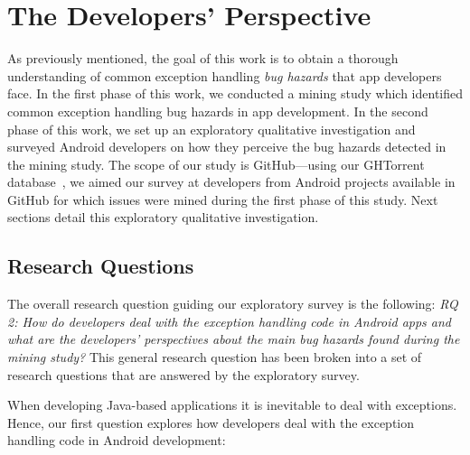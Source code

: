 {\bigskip


\bigskip

\section{The Developers' Perspective}
\label{sec:dev}


As previously mentioned, the goal of this work is to obtain a thorough understanding of common exception handling \emph{bug hazards} that app developers face. In the first phase of this work, we conducted a mining study which identified common exception handling bug hazards in app development.
 In the second phase of this work, we set up an exploratory qualitative investigation and surveyed Android developers on how they perceive the bug hazards detected in the mining study. The scope of our study is GitHub---using our GHTorrent database~\cite{Gousi13}, we aimed our survey at developers from Android projects available in GitHub for which issues were mined during the first phase of this study. Next sections detail this exploratory qualitative investigation.

\subsection{Research Questions}
The overall research question guiding our exploratory survey is
the following:
\emph{RQ 2: How do developers deal with the exception handling code in Android apps and what are the developers' perspectives about the main bug hazards found during the mining study?} This general research question has been broken into a set of research questions that are answered by the exploratory survey.

When developing Java-based applications it is inevitable to deal with exceptions. Hence, our first question explores how developers deal with the exception handling code in Android development:

}
